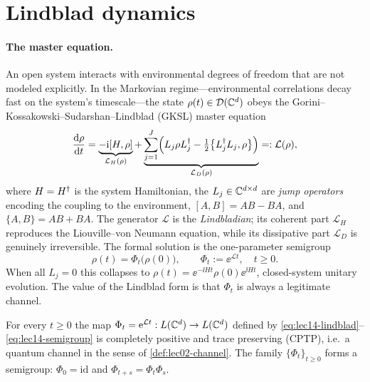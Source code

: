 \section{Lindblad dynamics}
\label{sec:lec14-1}

\paragraph{The master equation.}
An open system interacts with environmental degrees of freedom that are not modeled explicitly.
In the Markovian regime---environmental correlations decay fast on the system's timescale---the
state $\rho(t)\in\mathcal D(\mathbb{C}^d)$ obeys the Gorini--Kossakowski--Sudarshan--Lindblad (GKSL)
master equation
\begin{equation}
  \frac{\mathrm{d}\rho}{\mathrm{d} t}
  =\underbrace{-\mathrm{i}[H,\rho]}_{\mathcal L_H(\rho)}
   +\underbrace{\sum_{j=1}^{J}\Bigl(L_j\rho L_j^{\dagger}-\tfrac12\bigl\{L_j^{\dagger} L_j,\rho\bigr\}\Bigr)}
     _{\mathcal L_D(\rho)}
  =:\mathcal L(\rho),
  \label{eq:lec14-lindblad}
\end{equation}
where $H=H^{\dagger}$ is the system Hamiltonian, the $L_j\in\mathbb{C}^{d\times d}$ are \emph{jump operators}
encoding the coupling to the environment, $[A,B]=AB-BA$, and $\{A,B\}=AB+BA$. The generator
$\mathcal L$ is the \emph{Lindbladian}; its coherent part $\mathcal L_H$ reproduces the
Liouville--von Neumann equation, while its dissipative part $\mathcal L_D$ is genuinely
irreversible. The formal solution is the one-parameter semigroup
\begin{equation}
  \rho(t)=\Phi_t\bigl(\rho(0)\bigr),\qquad \Phi_t:=\ee^{\mathcal L t},\quad t\ge0.
  \label{eq:lec14-semigroup}
\end{equation}
When all $L_j=0$ this collapses to $\rho(t)=\ee^{-\ii Ht}\rho(0)\ee^{\ii Ht}$, closed-system
unitary evolution. The value of the Lindblad form is that $\Phi_t$ is always a legitimate
channel.

\begin{theorem}
\label{thm:lec14-cptp}
For every $t\ge0$ the map $\Phi_t=\mathrm{e}^{\mathcal L t}:L(\mathbb{C}^d)\to L(\mathbb{C}^d)$ defined by
\eqref{eq:lec14-lindblad}--\eqref{eq:lec14-semigroup} is completely positive and trace preserving
(CPTP), i.e.\ a quantum channel in the sense of \cref{def:lec02-channel}. The family
$\{\Phi_t\}_{t\ge0}$ forms a semigroup: $\Phi_0=\mathrm{id}$ and $\Phi_{t+s}=\Phi_t\Phi_s$.
\end{theorem}

